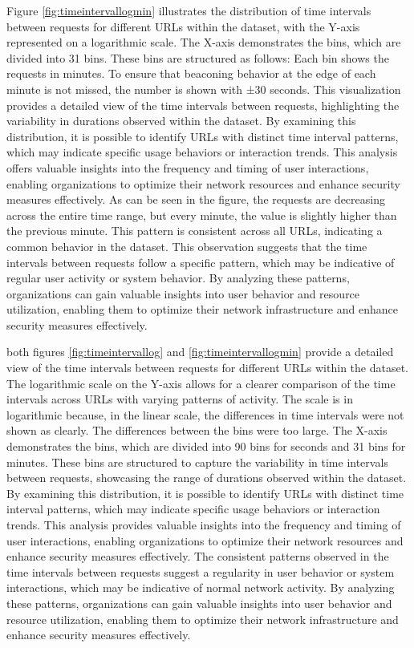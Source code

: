 Figure \ref{fig:timeintervallogmin} illustrates the distribution of time intervals between requests for different URLs within the dataset, with the Y-axis represented on a logarithmic scale. The X-axis demonstrates the bins, which are divided into 31 bins. These bins are structured as follows: Each bin shows the requests in minutes. To ensure that beaconing behavior at the edge of each minute is not missed, the number is shown with ±30 seconds. This visualization provides a detailed view of the time intervals between requests, highlighting the variability in durations observed within the dataset. By examining this distribution, it is possible to identify URLs with distinct time interval patterns, which may indicate specific usage behaviors or interaction trends. This analysis offers valuable insights into the frequency and timing of user interactions, enabling organizations to optimize their network resources and enhance security measures effectively. As can be seen in the figure, the requests are decreasing across the entire time range, but every minute, the value is slightly higher than the previous minute. This pattern is consistent across all URLs, indicating a common behavior in the dataset. This observation suggests that the time intervals between requests follow a specific pattern, which may be indicative of regular user activity or system behavior. By analyzing these patterns, organizations can gain valuable insights into user behavior and resource utilization, enabling them to optimize their network infrastructure and enhance security measures effectively.

both figures \ref{fig:timeintervallog} and \ref{fig:timeintervallogmin} provide a detailed view of the time intervals between requests for different URLs within the dataset. The logarithmic scale on the Y-axis allows for a clearer comparison of the time intervals across URLs with varying patterns of activity. The scale is in logarithmic because, in the linear scale, the differences in time intervals were not shown as clearly. The differences between the bins were too large. The X-axis demonstrates the bins, which are divided into 90 bins for seconds and 31 bins for minutes. These bins are structured to capture the variability in time intervals between requests, showcasing the range of durations observed within the dataset. By examining this distribution, it is possible to identify URLs with distinct time interval patterns, which may indicate specific usage behaviors or interaction trends. This analysis provides valuable insights into the frequency and timing of user interactions, enabling organizations to optimize their network resources and enhance security measures effectively. The consistent patterns observed in the time intervals between requests suggest a regularity in user behavior or system interactions, which may be indicative of normal network activity. By analyzing these patterns, organizations can gain valuable insights into user behavior and resource utilization, enabling them to optimize their network infrastructure and enhance security measures effectively.

